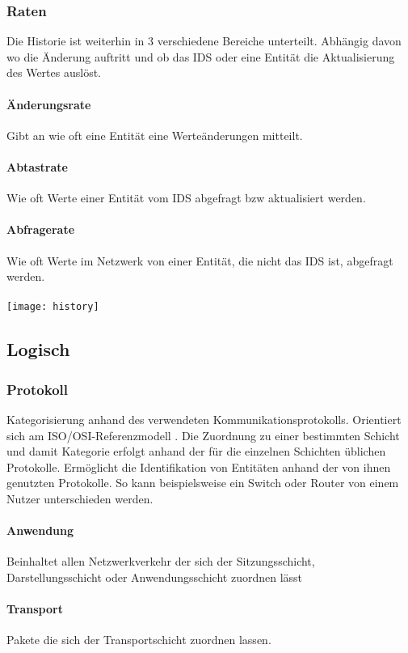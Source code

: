 \subsubsection{Raten}
Die Historie ist weiterhin in 3 verschiedene Bereiche unterteilt. Abhängig davon wo die Änderung auftritt und ob das IDS oder eine Entität die Aktualisierung des Wertes auslöst.
\paragraph{Änderungsrate} 
Gibt an wie oft eine Entität eine Werteänderungen mitteilt.
\paragraph{Abtastrate}
Wie oft Werte einer Entität vom IDS abgefragt bzw aktualisiert werden.
\paragraph{Abfragerate}
Wie oft Werte im Netzwerk von einer Entität, die nicht das IDS ist, abgefragt werden.\\\\
\texttt{[image: history]}

\subsection{Logisch}
\subsubsection{Protokoll}
Kategorisierung anhand des verwendeten Kommunikationsprotokolls. Orientiert sich am ISO/OSI-Referenzmodell \cite{day1983osi}. Die Zuordnung zu einer bestimmten Schicht und damit Kategorie erfolgt anhand der für die einzelnen Schichten üblichen Protokolle. Ermöglicht die Identifikation von Entitäten anhand der von ihnen genutzten Protokolle. So kann beispielsweise ein Switch oder Router von einem Nutzer unterschieden werden.
\paragraph{Anwendung}
Beinhaltet allen Netzwerkverkehr der sich der Sitzungsschicht, Darstellungsschicht oder Anwendungsschicht zuordnen lässt 
\paragraph{Transport}
Pakete die sich der Transportschicht zuordnen lassen.
